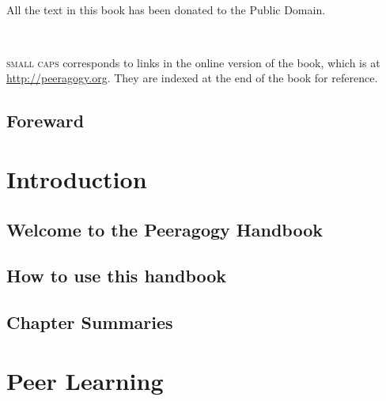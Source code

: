 \documentclass[ebook, 12pt, twoside]{memoir}
\newcommand\blankpage{%
    \null
    \thispagestyle{empty}%
    \addtocounter{page}{-1}%
    \newpage}
\let\sc\scshape
\let\sc\scshape
\begin{document}
\quad \\[3in] 
\begin{center}
{\large All the text in this book has been donated to the Public Domain.}
\end{center}
\quad \\
\begin{center}
{\large {\sc small caps} corresponds to links in the online version of
  the book, which is at \url{http://peeragogy.org}.  
  They are indexed at the end of the book for reference.}
\end{center}
\thispagestyle{empty}
\cleardoublepage

\frontmatter
\pagestyle{empty}
\thispagestyle{empty}
\setcounter{page}{-1}
{
\changepage{10mm}{}{}{}{}{-10mm}{}{}{}{}{}{}{}{}
\tableofcontents*
}

\mainmatter

{}
\chapter*{Foreward}
%


\part{Introduction} %
\pagestyle{companion}
\chapter[\textbf{Welcome!}]{Welcome to the Peeragogy Handbook}
%

%
\chapter[\textbf{How to use this handbook}]{How to use this handbook}
%

\chapter[\textbf{Chapter Summaries}]{Chapter Summaries}
%


\part{Peer Learning} %
%
\end{document}
